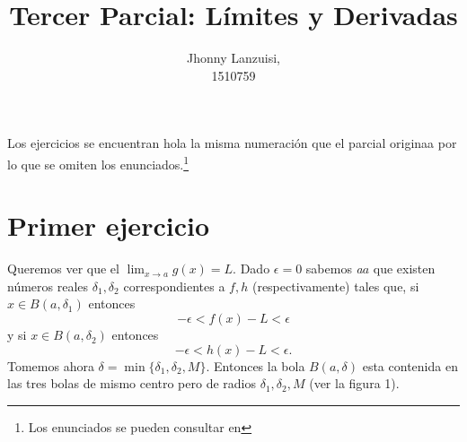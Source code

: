 \documentclass[fleqn,leqno,10pt,letterpaper,final]{article}
\title{Tercer Parcial: Límites y Derivadas}
\author{Jhonny Lanzuisi,\\ 1510759}
\begin{document}
\maketitle
\tableofcontents

\noindent
Los ejercicios se encuentran hola la misma numeración que el parcial originaa
por lo que se omiten los enunciados.\footnote{Los enunciados se pueden consultar en} 
\section{Primer ejercicio}
Queremos ver que el $ \lim_{x\to a} g(x)=L$. Dado $\epsilon =0$ sabemos \textit{a}$a$ que existen números reales
$\delta_1,\delta_2$ correspondientes a $f,h$ (respectivamente) tales que, si $x\in B(a,\delta_1)$ entonces
\[
	-\epsilon<f(x)-L<\epsilon
\]
y si $x\in B(a,\delta_2)$ entonces
\[
	-\epsilon<h(x)-L<\epsilon.
\]
Tomemos ahora $\delta=\min\{\delta_1,\delta_2,M\}$. Entonces la bola $B(a,\delta)$ esta contenida 
en las tres bolas de mismo centro pero de radios $\delta_1,\delta_2,M$ (ver la figura 1).%
%
\end{document}
